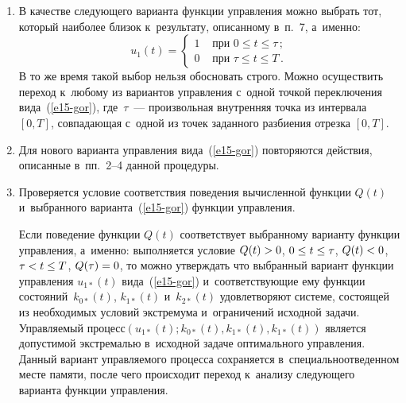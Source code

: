 \begin{multicols}{2}
\begin{enumerate}[1.]
\item В качестве следующего варианта функции управ\-ле\-ния можно выбрать тот, 
который наиболее близок к~результату, описанному в~п.~7, а~именно:
\begin{equation} 
u_{1}(t)=\begin{cases}
1 &\mbox{ при } 0\leq t \leq \tau\,;
\\
0  &\mbox{ при } \tau \leq t \leq T\,.
\end{cases}
\label{e15-gor}
\end{equation}
В то же время такой выбор нельзя обосновать строго. Можно осуществить переход 
к~любому из вариантов управления с~одной точкой переключения вида~(\ref{e15-gor}), 
где~$\tau$~--- произвольная внутренняя точка из интервала $[0,T]$, совпадающая 
с~одной из точек заданного разбиения отрезка $[0,T]$.

\item Для нового варианта управления вида~(\ref{e15-gor}) повторяются действия, 
описанные в~пп.~2--4 данной процедуры.

\item  Проверяется условие соответствия поведения вычисленной функции $Q(t)$ 
и~выбранного варианта~(\ref{e15-gor}) функции управления.

Если поведение функции $Q(t)$ соответствует выбранному варианту функции управления,
а~именно: выполняется условие $Q(t)\hm>0$, $0 \hm\leq t \hm\leq \tau$, $Q(t)\hm<0$, 
$\tau \hm< t \hm\leq T$, $Q(\tau)\hm=0$, то можно утверждать что выбранный вариант 
функции управления $u_{1*}(t)$ вида~(\ref{e15-gor}) и~соответствующие ему функции 
состояний~$k_{0*}(t)$, $k_{1*}(t)$ и~$k_{2*}(t)$ удовлетворяют системе, состоящей из 
необходимых условий экстремума и~ограничений исходной задачи. Управ\-ля\-емый 
процесс\linebreak $(u_{1*}(t);k_{0*}(t),k_{1*}(t),k_{1*}(t))$ является допустимой 
экстремалью в~исходной задаче оптимального управления. Данный вариант 
управля\-емо\-го процесса сохраняется в~специально\linebreak отведенном месте памяти, 
после чего происходит переход к~анализу следующего варианта функции управления.

\begin{figure*}[b] %
 \vspace*{6pt}
 \begin{center}
 \mbox{%
 \epsfxsize=127.491mm
 }
 \end{center}
 \vspace*{-6pt}
\end{figure*}



\end{enumerate}
\end{multicols}
